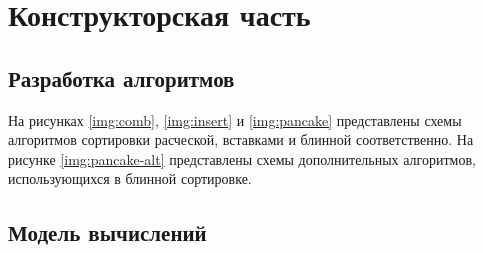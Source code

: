 \chapter{Конструкторская часть}

\section{Разработка алгоритмов}

На рисунках \ref{img:comb}, \ref{img:insert} и \ref{img:pancake} представлены схемы алгоритмов сортировки расческой, вставками и блинной соответственно.
На рисунке \ref{img:pancake-alt} представлены схемы дополнительных алгоритмов, использующихся в блинной сортировке.


\section{Модель вычислений}

